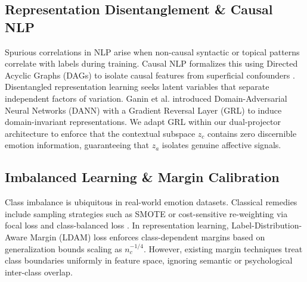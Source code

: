 \documentclass[journal,twocolumn]{article}
\begin{document}
\subsection{Representation Disentanglement \& Causal NLP}
Spurious correlations in NLP arise when non-causal syntactic or topical patterns correlate with labels during training. Causal NLP formalizes this using Directed Acyclic Graphs (DAGs) to isolate causal features from superficial confounders \cite{cheng2020club}. Disentangled representation learning seeks latent variables that separate independent factors of variation. Ganin et al. \cite{ganin2016domain} introduced Domain-Adversarial Neural Networks (DANN) with a Gradient Reversal Layer (GRL) to induce domain-invariant representations. We adapt GRL within our dual-projector architecture to enforce that the contextual subspace $z_c$ contains zero discernible emotion information, guaranteeing that $z_a$ isolates genuine affective signals.

\subsection{Imbalanced Learning \& Margin Calibration}
Class imbalance is ubiquitous in real-world emotion datasets. Classical remedies include sampling strategies such as SMOTE \cite{chawla2002smote} or cost-sensitive re-weighting via focal loss \cite{lin2017focal} and class-balanced loss \cite{cui2019class}. In representation learning, Label-Distribution-Aware Margin (LDAM) loss \cite{cao2019ldam} enforces class-dependent margins based on generalization bounds scaling as $n_c^{-1/4}$. However, existing margin techniques treat class boundaries uniformly in feature space, ignoring semantic or psychological inter-class overlap.
\end{document}
